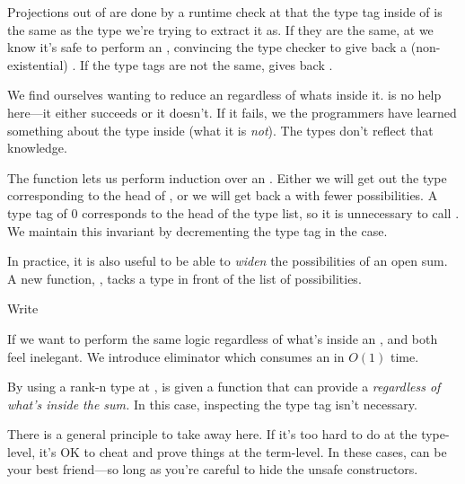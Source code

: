 \documentclass[book.tex]{subfiles}
\begin{document}

Projections out of  are done by a runtime check at  that the
 type tag inside of  is the same as the type we're trying to
extract it as. If they are the same, at  we know it's safe to perform an
, convincing the type checker to give back a (non-existential)
. If the type tags are not the same,  gives back .

We find ourselves wanting to reduce an  regardless of whats inside
it.  is no help here---it either succeeds or it doesn't. If it fails, we
the programmers have learned something about the type inside (what it is
\emph{not}). The types don't reflect that knowledge.


The  function lets us perform induction over an .
Either we will get out the type corresponding to the head of , or we will
get back a  with fewer possibilities. A type tag of 0 corresponds
to the head of the type list, so it is unnecessary to call . We
maintain this invariant by decrementing the type tag in the  case.

In practice, it is also useful to be able to \emph{widen} the possibilities of
an open sum. A new function, , tacks a  type in front of
the list of possibilities.

\begin{exercise}
Write 
\end{exercise}
\begin{solution}
\end{solution}

If we want to perform the same logic regardless of what's inside an
,  and  both feel inelegant. We introduce
 eliminator which consumes an  in $O(1)$ time.


By using a rank-n type at ,  is given a function that can
provide a  \emph{regardless of what's inside the sum.} In this case,
inspecting the type tag isn't necessary.

There is a general principle to take away here. If it's too hard to do at the
type-level, it's OK to cheat and prove things at the term-level. In these cases,
 can be your best friend---so long as you're careful to hide
the unsafe constructors.
\end{document}
